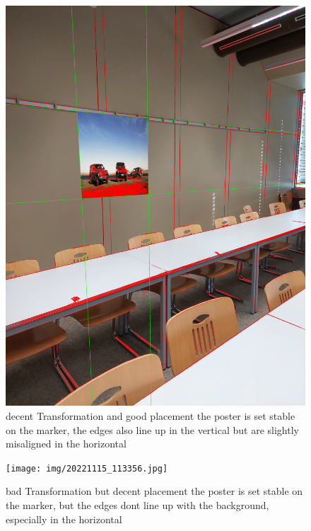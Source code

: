 \documentclass[a4paper,twocolumn]{article}
\begin{document}
\begin{figure}[h!]
\centering
\includegraphics[width=0.9\columnwidth]{img/20221115_113346.jpg} %
\caption{decent Transformation and good placement the poster is set stable on the marker, the edges also line up in the vertical but are slightly misaligned in the horizontal }
\label{fig:20221115_113346.jpg}
\end{figure}

\begin{figure}[h!]
\centering
\texttt{[image: img/20221115\_113356.jpg]} %
\caption{bad Transformation but decent placement the poster is set stable on the marker, but the edges dont line up with the background, especially in the horizontal}
\label{fig:20221115_113356.jpg}
\end{figure}
\end{document}
